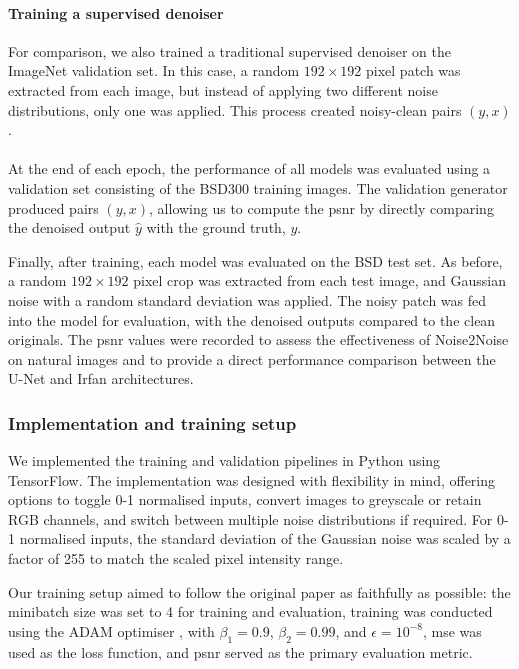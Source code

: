 \paragraph{Training a supervised denoiser}
For comparison, we also trained a traditional supervised denoiser on the ImageNet validation set. In this case, a random $192 \times 192$ pixel patch was extracted from each image, but instead of applying two different noise distributions, only one was applied. This process created noisy-clean pairs $(y, x)$.

\paragraph{}
At the end of each epoch, the performance of all models was evaluated using a validation set consisting of the BSD300 training images. The validation generator produced pairs $(y, x)$, allowing us to compute the \acrshort{psnr} by directly comparing the denoised output $\hat{y}$ with the ground truth, $y$.

Finally, after training, each model was evaluated on the BSD test set. As before, a random $192 \times 192$ pixel crop was extracted from each test image, and Gaussian noise with a random standard deviation was applied. The noisy patch was fed into the model for evaluation, with the denoised outputs compared to the clean originals. The \acrshort{psnr} values were recorded to assess the effectiveness of Noise2Noise on natural images and to provide a direct performance comparison between the U-Net and Irfan architectures.

\subsubsection{Implementation and training setup}

We implemented the training and validation pipelines in Python using TensorFlow. The implementation was designed with flexibility in mind, offering options to toggle 0-1 normalised inputs, convert images to greyscale or retain RGB channels, and switch between multiple noise distributions if required. For 0-1 normalised inputs, the standard deviation of the Gaussian noise was scaled by a factor of 255 to match the scaled pixel intensity range.

Our training setup aimed to follow the original paper as faithfully as possible: the minibatch size was set to 4 for training and evaluation, training was conducted using the ADAM optimiser \cite{kingma_adam_2014}, with $\beta_1 = 0.9$, $\beta_2 = 0.99$, and $\epsilon = 10^{-8}$, \acrfull{mse} was used as the loss function, and \acrshort{psnr} served as the primary evaluation metric. 

